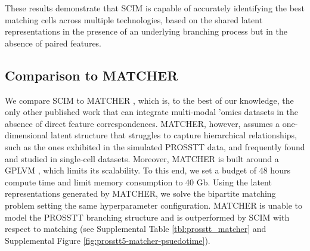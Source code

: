 
These results demonstrate that SCIM is capable of accurately identifying the best matching cells across multiple technologies, based on the shared latent representations in the presence of an underlying branching process but in the absence of paired features.

\subsection{Comparison to MATCHER}
We compare SCIM to MATCHER \citep{welch2017}, which is, to the best of our knowledge, the only other published work that can integrate multi-modal 'omics datasets in the absence of direct feature correspondences.
MATCHER, however, assumes a one-dimensional latent structure that struggles to capture hierarchical relationships, such as the ones exhibited in the simulated PROSSTT data, and frequently found and studied in single-cell datasets.
Moreover, MATCHER is built around a GPLVM \citep{lawrence2004}, which limits its scalability.
To this end, we set a budget of 48 hours compute time and limit memory consumption to 40 Gb.
Using the latent representations generated by MATCHER, we solve the bipartite matching problem setting the same hyperparameter configuration.
MATCHER is unable to model the PROSSTT branching structure and is outperformed by SCIM with respect to matching (see Supplemental Table  \ref{tbl:prosstt_matcher} and Supplemental Figure \ref{fig:prosstt5-matcher-psuedotime}).

